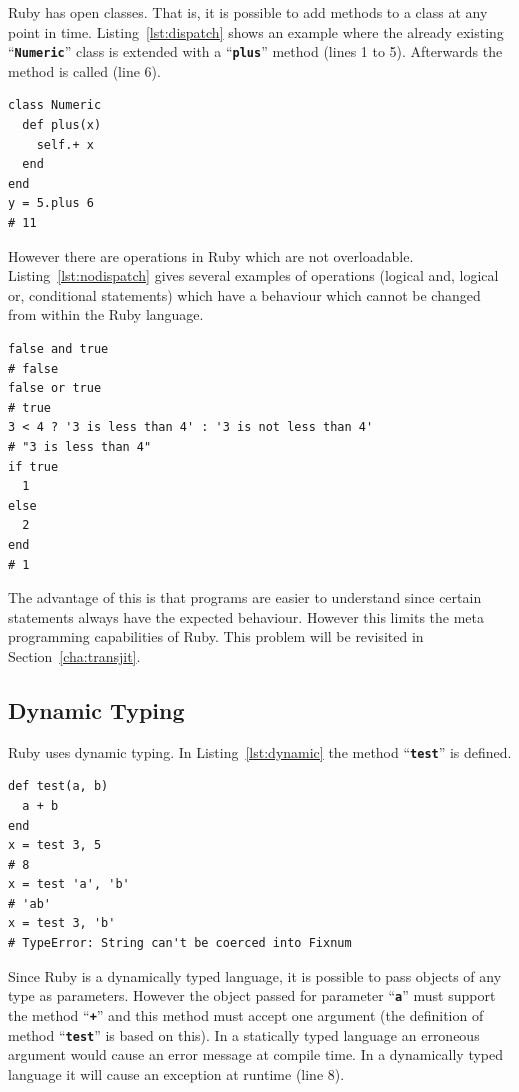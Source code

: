 \documentclass[12pt,a4paper,oneside,openright]{book}
\newcommand{\Ie}{That is, }
\newcommand{\sct}[1]{Section~\ref{cha:#1}}
\newcommand{\lst}[1]{Listing~\ref{lst:#1}}
\newcommand{\code}[1]{``\texttt{\textbf{\textcolor{codegray}{\small{#1}}}}''}
\begin{document}
\begin{CJK}{UTF8}{}
Ruby has open classes. \Ie it is possible to add methods to a class at any point in time. \lst{dispatch} shows an example where the already existing \code{Numeric} class is extended with a \code{plus} method (lines 1 to 5). Afterwards the method is called (line 6).
\lstset{language=Ruby,frame=single,numbers=left}
\begin{lstlisting}[float=htbp,caption={Method dispatch in Ruby},label=lst:dispatch]
class Numeric
  def plus(x)
    self.+ x
  end
end
y = 5.plus 6
# 11
\end{lstlisting}

However there are operations in Ruby which are not overloadable. \lst{nodispatch} gives several examples of operations (logical and, logical or, conditional statements) which have a behaviour which cannot be changed from within the Ruby language.
\begin{lstlisting}[float=htbp,caption={Methods in Ruby which are not overloadable},label=lst:nodispatch]
false and true
# false
false or true
# true
3 < 4 ? '3 is less than 4' : '3 is not less than 4'
# "3 is less than 4"
if true
  1
else
  2
end
# 1
\end{lstlisting}
The advantage of this is that programs are easier to understand since certain statements always have the expected behaviour. However this limits the meta programming capabilities of Ruby. This problem will be revisited in \sct{transjit}.

\subsection{Dynamic Typing}\label{cha:dynnum}
Ruby uses dynamic typing. In \lst{dynamic} the method \code{test} is defined.
\lstset{language=Ruby,frame=single,numbers=left}
\begin{lstlisting}[float=htbp,caption={Dynamic typing in Ruby},label=lst:dynamic]
def test(a, b)
  a + b
end
x = test 3, 5
# 8
x = test 'a', 'b'
# 'ab'
x = test 3, 'b'
# TypeError: String can't be coerced into Fixnum
\end{lstlisting}
Since Ruby is a dynamically typed language, it is possible to pass objects of any type as parameters. However the object passed for parameter \code{a} must support the method \code{+} and this method must accept one argument (the definition of method \code{test} is based on this). In a statically typed language an erroneous argument would cause an error message at compile time. In a dynamically typed language it will cause an exception at runtime (line 8).


\end{CJK}
\end{document}
